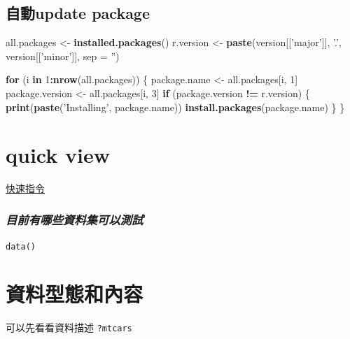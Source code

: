 \documentclass[]{book}
\newenvironment{Shaded}{\begin{snugshade}}{\end{snugshade}}
\newcommand{\ControlFlowTok}[1]{\textcolor[rgb]{0.13,0.29,0.53}{\textbf{#1}}}
\newcommand{\DataTypeTok}[1]{\textcolor[rgb]{0.13,0.29,0.53}{#1}}
\newcommand{\DecValTok}[1]{\textcolor[rgb]{0.00,0.00,0.81}{#1}}
\newcommand{\KeywordTok}[1]{\textcolor[rgb]{0.13,0.29,0.53}{\textbf{#1}}}
\newcommand{\NormalTok}[1]{#1}
\newcommand{\OperatorTok}[1]{\textcolor[rgb]{0.81,0.36,0.00}{\textbf{#1}}}
\newcommand{\StringTok}[1]{\textcolor[rgb]{0.31,0.60,0.02}{#1}}
\theoremstyle{definition}
\theoremstyle{definition}
\theoremstyle{definition}
\theoremstyle{remark}
\begin{document}
\hypertarget{update-package}{%
\subsection{自動update package}\label{update-package}}

\begin{Shaded}
\begin{Highlighting}[]
\NormalTok{all.packages <-}\StringTok{ }\KeywordTok{installed.packages}\NormalTok{()}
\NormalTok{r.version <-}\StringTok{ }\KeywordTok{paste}\NormalTok{(version[[}\StringTok{'major'}\NormalTok{]], }\StringTok{'.'}\NormalTok{, version[[}\StringTok{'minor'}\NormalTok{]], }\DataTypeTok{sep =} \StringTok{''}\NormalTok{)}
 
\ControlFlowTok{for}\NormalTok{ (i }\ControlFlowTok{in} \DecValTok{1}\OperatorTok{:}\KeywordTok{nrow}\NormalTok{(all.packages))}
\NormalTok{\{}
\NormalTok{    package.name <-}\StringTok{ }\NormalTok{all.packages[i, }\DecValTok{1}\NormalTok{]}
\NormalTok{    package.version <-}\StringTok{ }\NormalTok{all.packages[i, }\DecValTok{3}\NormalTok{]}
    \ControlFlowTok{if}\NormalTok{ (package.version }\OperatorTok{!=}\StringTok{ }\NormalTok{r.version)}
\NormalTok{    \{}
        \KeywordTok{print}\NormalTok{(}\KeywordTok{paste}\NormalTok{(}\StringTok{'Installing'}\NormalTok{, package.name))}
        \KeywordTok{install.packages}\NormalTok{(package.name)}
\NormalTok{    \}}
\NormalTok{\}}
\end{Highlighting}
\end{Shaded}

\hypertarget{quick-view}{%
\section{quick view}\label{quick-view}}

\href{http://www3.nccu.edu.tw/~99354011/R\%20commands\%2811.09.13\%29.pdf}{快速指令}

\subsubsection{\texorpdfstring{\emph{目前有哪些資料集可以測試}}{目前有哪些資料集可以測試}}

\texttt{data()}

\section{資料型態和內容}

可以先看看資料描述 \texttt{?mtcars}
\end{document}
